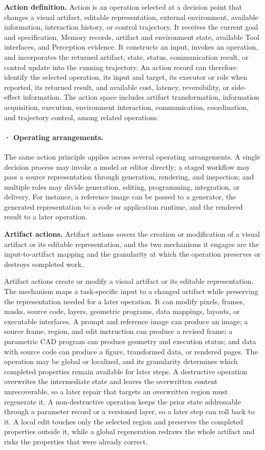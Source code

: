 \textbf{Action definition.} Action is an operation selected at a decision point that changes a visual artifact, editable representation, external environment, available information, interaction history, or control trajectory. It receives the current goal and specification, Memory records, artifact and environment state, available Tool interfaces, and Perception evidence. It constructs an input, invokes an operation, and incorporates the returned artifact, state, status, communication result, or control update into the running trajectory. An action record can therefore identify the selected operation, its input and target, its executor or role when reported, its returned result, and available cost, latency, reversibility, or side-effect information. The action space includes artifact transformation, information acquisition, execution, environment interaction, communication, coordination, and trajectory control, among related operations.

\paragraph{· Operating arrangements.} The same action principle applies across several operating arrangements. A single decision process may invoke a model or editor directly; a staged workflow may pass a source representation through generation, rendering, and inspection; and multiple roles may divide generation, editing, programming, integration, or delivery. For instance, a reference image can be passed to a generator, the generated representation to a code or application runtime, and the rendered result to a later operation.

\textbf{Artifact actions.} Artifact actions covers the creation or modification of a visual artifact or its editable representation, and the two mechanisms it engages are the input-to-artifact mapping and the granularity at which the operation preserves or destroys completed work.

Artifact actions create or modify a visual artifact or its editable representation. The mechanism maps a task-specific input to a changed artifact while preserving the representation needed for a later operation. It can modify pixels, frames, masks, source code, layers, geometric programs, data mappings, layouts, or executable interfaces. A prompt and reference image can produce an image; a source frame, region, and edit instruction can produce a revised frame; a parametric CAD program can produce geometry and execution status; and data with source code can produce a figure, transformed data, or rendered pages. The operation may be global or localized, and its granularity determines which completed properties remain available for later steps. A destructive operation overwrites the intermediate state and leaves the overwritten content unrecoverable, so a later repair that targets an overwritten region must regenerate it. A non-destructive operation keeps the prior state addressable through a parameter record or a versioned layer, so a later step can roll back to it. A local edit touches only the selected region and preserves the completed properties outside it, while a global regeneration redraws the whole artifact and risks the properties that were already correct.

